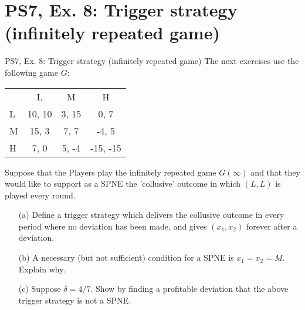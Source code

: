 \section{PS7, Ex. 8: Trigger strategy (infinitely repeated game)}

\begin{frame}{PS7, Ex. 8: Trigger strategy (infinitely repeated game)}
  The next exercises use the following game $G$:
  \begin{table}
    \begin{tabular}{l|c|c|c|}
      \multicolumn{1}{c}{} & \multicolumn{1}{c}{L} & \multicolumn{1}{c}{M} & \multicolumn{1}{c}{H} \\\cline{2-4}
      L & 10, 10 & 3, 15 & 0, 7 \\\cline{2-4}
      M & 15, 3 & 7, 7 & -4, 5 \\\cline{2-4}
      H & 7, 0 & 5, -4 & -15, -15 \\\cline{2-4}
    \end{tabular}
  \end{table}
  Suppose that the Players play the infinitely repeated game $G(\infty)$ and that they would like to support as a SPNE the 'collusive' outcome in which $(L, L)$ is played every round.
  \begin{itemize}
    \item[(a)] Define a trigger strategy which delivers the collusive outcome in every period where no deviation has been made, and gives $(x_1, x_2)$ forever after a deviation.
    \item[(b)] A necessary (but not sufficient) condition for a SPNE is $x_1 = x_2 = M$. Explain why.
    \vspace{-4pt} \item[(c)] Suppose $\delta = 4/7$. Show by finding a profitable deviation that the above trigger strategy is not a SPNE. \vspace{-6pt}
  \end{itemize}
  \vfill\null
\end{frame}

